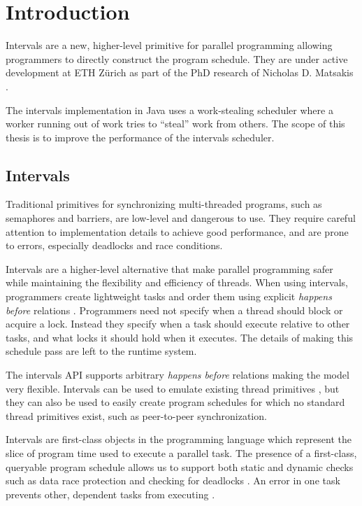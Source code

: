 
\chapter{Introduction}
\label{chap:introduction}

Intervals \cite{Matsakis2009a} are a new, higher-level primitive for
parallel programming allowing programmers to directly construct the
program schedule. They are under active development at ETH Zürich as
part of the PhD research of Nicholas D. Matsakis \cite{Matsakis2010}.

The intervals implementation in Java uses a work-stealing scheduler
where a worker running out of work tries to ``steal'' work from
others. The scope of this thesis is to improve the performance of the
intervals scheduler.


\section{Intervals}
\label{sec:intro-intervals}

Traditional primitives for synchronizing multi-threaded programs, such
as semaphores and barriers, are low-level and dangerous to use. They
require careful attention to implementation details to achieve good
performance, and are prone to errors, especially deadlocks and race
conditions.

Intervals are a higher-level alternative that make parallel
programming safer while maintaining the flexibility and efficiency of
threads. When using intervals, programmers create lightweight tasks
and order them using explicit \emph{happens before} relations
\cite{Lamport1978}. Programmers need not specify when a thread should
block or acquire a lock. Instead they specify when a task should
execute relative to other tasks, and what locks it should hold when it
executes. The details of making this schedule pass are left to the
runtime system.

The intervals API supports arbitrary \emph{happens before} relations
making the model very flexible. Intervals can be used to emulate
existing thread primitives \cite{Matsakis2009a}, but they can also be
used to easily create program schedules for which no standard thread
primitives exist, such as peer-to-peer synchronization.

Intervals are first-class objects in the programming language which
represent the slice of program time used to execute a parallel
task. The presence of a first-class, queryable program schedule allows
us to support both static and dynamic checks such as data race
protection \cite{Matsakis2010b} and checking for deadlocks
\cite{Matsakis2009}. An error in one task prevents other, dependent
tasks from executing \cite{Matsakis2010a}.

